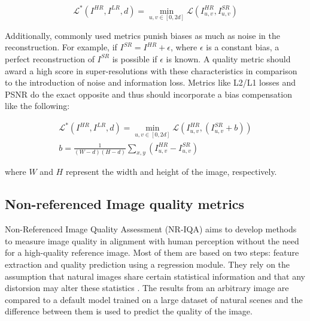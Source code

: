             \begin{equation}
               \mathcal{L}^* ( I^{HR}, I^{LR}, d) = \min_{u,v \in [0,2d]} \mathcal{L} ( I^{HR}_{u,v}, I^{SR}_{u,v})
            \label{eq:4_adjusted_metrics}
            \end{equation}
    
            Additionally, commonly used metrics punish biases as much as noise in the reconstruction.
            For example, if $I^{SR} = I^{HR} + \epsilon$, where $\epsilon$ is a constant bias, a perfect reconstruction of $I^{SR}$ is possible if $\epsilon$ is known. 
            A quality metric should award a high score in super-resolutions with these characteristics in comparison to the introduction of noise and information loss. Metrics like L2/L1 losses and PSNR do the exact opposite and thus should incorporate a bias compensation like the following: 
    
            \begin{equation}
                \begin{aligned}
                    \mathcal{L}^* ( I^{HR}, I^{LR}, d) = \min_{u,v \in [0,2d]} \mathcal{L} ( I^{HR}_{u,v}, (I^{SR}_{u,v}+b)) \\
                    b = \frac{1}{(W - d)(H - d)} \sum_{x,y} \left( I^{HR}_{u,v} - I^{SR}_{u,v} \right)
               \end{aligned}
            \end{equation}
    
            \noindent where $W$ and $H$ represent the width and height of the image, respectively.
    

    \subsection{Non-referenced Image quality metrics}

    Non-Referenced Image Quality Assessment (NR-IQA) aims to develop methods to measure image quality in alignment with human perception without the need for a high-quality reference image. 
    Most of them are based on two steps: feature extraction and quality prediction using a regression module. 
    They rely on the assumption that natural images share certain statistical information and that any distorsion may alter these statistics \cite{niqe}.
    The results from an arbitrary image are compared to a default model trained on a large dataset of natural scenes and the difference  between them is used to predict the quality of the image.

